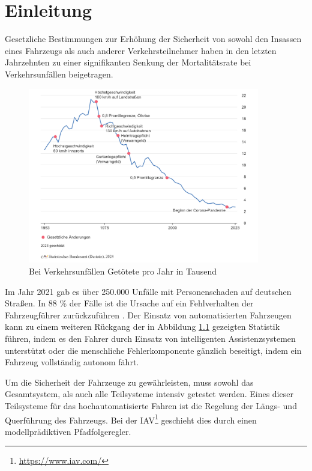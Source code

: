 \chapter{Einleitung} \label{chap:Einleitung}
\thispagestyle{empty}
Gesetzliche Bestimmungen zur Erhöhung der Sicherheit von sowohl den Insassen eines Fahrzeugs als auch anderer Verkehrsteilnehmer haben in den letzten Jahrzehnten zu einer signifikanten Senkung der Mortalitätsrate bei Verkehrsunfällen beigetragen.
\begin{figure}[H]
    \centering
    \includegraphics[width=0.9\textwidth]{figures/1_Einleitung/verkehrsunfaelle-getoetete-jahr.png}
    \caption{Bei Verkehrsunfällen Getötete pro Jahr in Tausend \cite{StBA2021}}
    \label{fig:Statistik_Tote}
\end{figure}
\noindent Im Jahr 2021 gab es über 250.000 Unfälle mit Personenschaden auf deutschen Straßen. In 88 \% der Fälle ist die Ursache auf ein Fehlverhalten der Fahrzeugführer zurückzuführen \cite{StBA2021}. Der Einsatz von automatisierten Fahrzeugen kann zu einem weiteren Rückgang der in Abbildung \ref{fig:Statistik_Tote} gezeigten Statistik führen, indem es den Fahrer durch Einsatz von intelligenten Assistenzsystemen unterstützt oder die menschliche Fehlerkomponente gänzlich beseitigt, indem ein Fahrzeug vollständig autonom fährt.

Um die Sicherheit der Fahrzeuge zu gewährleisten, muss sowohl das Gesamtsystem, als auch alle Teilsysteme intensiv getestet werden. Eines dieser Teilsysteme für das hochautomatisierte Fahren ist die Regelung der Längs- und Querführung des Fahrzeugs. Bei der IAV\footnote{\url{https://www.iav.com/}} geschieht dies durch einen modellprädiktiven Pfadfolgeregler.\bigskip

